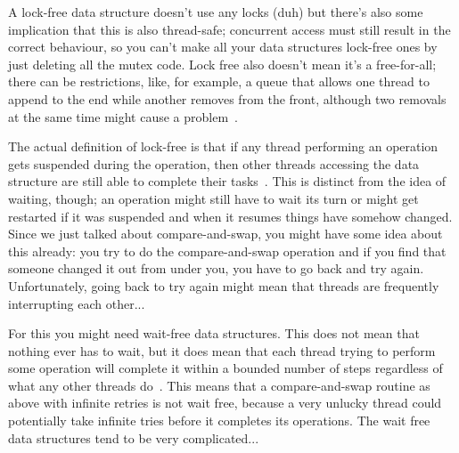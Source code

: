 \documentclass[a4paper]{report}
\begin{document}
A lock-free data structure doesn't use any locks (duh) but there's also some implication that this is also thread-safe; concurrent access must still result in the correct behaviour, so you can't make all your data structures lock-free ones by just deleting all the mutex code. Lock free also doesn't mean it's a free-for-all; there can be restrictions, like, for example, a queue that allows one thread to append to the end while another removes from the front, although two removals at the same time might cause a problem~\cite{nblfwf}.

The actual definition of lock-free is that if any thread performing an operation gets suspended during the operation, then other threads accessing the data structure are still able to complete their tasks~\cite{nblfwf}. This is distinct from the idea of waiting, though; an operation might still have to wait its turn or might get restarted if it was suspended and when it resumes things have somehow changed. Since we just talked about compare-and-swap, you might have some idea about this already: you try to do the compare-and-swap operation and if you find that someone changed it out from under you, you have to go back and try again. Unfortunately, going back to try again might mean that threads are frequently interrupting each other...

For this you might need wait-free data structures. This does not mean that nothing ever has to wait, but it does mean that each thread trying to perform some operation will complete it within a bounded number of steps regardless of what any other threads do~\cite{nblfwf}. This means that a compare-and-swap routine as above with infinite retries is not wait free, because a very unlucky thread could potentially take infinite tries before it completes its operations. The wait free data structures tend to be very complicated...
\end{document}
